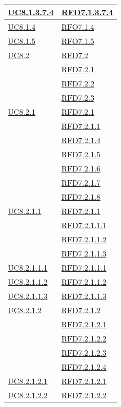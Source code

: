 \begin{longtable}{|>{\centering}m{5cm}|m{5cm}<{\centering}|}
\hyperref[UC8.1.3.7.4]{UC8.1.3.7.4} & \hyperlink{RFD7.1.3.7.4}{RFD7.1.3.7.4}\\ \hline
\hyperref[UC8.1.4]{UC8.1.4} & \hyperlink{RFO7.1.4}{RFO7.1.4}\\ \hline
\hyperref[UC8.1.5]{UC8.1.5} & \hyperlink{RFO7.1.5}{RFO7.1.5}\\ \hline
\hyperref[UC8.2]{UC8.2} & \hyperlink{RFD7.2}{RFD7.2}\\
& \hyperlink{RFD7.2.1}{RFD7.2.1}\\
& \hyperlink{RFD7.2.2}{RFD7.2.2}\\
& \hyperlink{RFD7.2.3}{RFD7.2.3}\\ \hline
\hyperref[UC8.2.1]{UC8.2.1} & \hyperlink{RFD7.2.1}{RFD7.2.1}\\
& \hyperlink{RFD7.2.1.1}{RFD7.2.1.1}\\
& \hyperlink{RFD7.2.1.4}{RFD7.2.1.4}\\
& \hyperlink{RFD7.2.1.5}{RFD7.2.1.5}\\
& \hyperlink{RFD7.2.1.6}{RFD7.2.1.6}\\
& \hyperlink{RFD7.2.1.7}{RFD7.2.1.7}\\
& \hyperlink{RFD7.2.1.8}{RFD7.2.1.8}\\ \hline
\hyperref[UC8.2.1.1]{UC8.2.1.1} & \hyperlink{RFD7.2.1.1}{RFD7.2.1.1}\\
& \hyperlink{RFD7.2.1.1.1}{RFD7.2.1.1.1}\\
& \hyperlink{RFD7.2.1.1.2}{RFD7.2.1.1.2}\\
& \hyperlink{RFD7.2.1.1.3}{RFD7.2.1.1.3}\\ \hline
\hyperref[UC8.2.1.1.1]{UC8.2.1.1.1} & \hyperlink{RFD7.2.1.1.1}{RFD7.2.1.1.1}\\ \hline
\hyperref[UC8.2.1.1.2]{UC8.2.1.1.2} & \hyperlink{RFD7.2.1.1.2}{RFD7.2.1.1.2}\\ \hline
\hyperref[UC8.2.1.1.3]{UC8.2.1.1.3} & \hyperlink{RFD7.2.1.1.3}{RFD7.2.1.1.3}\\ \hline
\hyperref[UC8.2.1.2]{UC8.2.1.2} & \hyperlink{RFD7.2.1.2}{RFD7.2.1.2}\\
& \hyperlink{RFD7.2.1.2.1}{RFD7.2.1.2.1}\\
& \hyperlink{RFD7.2.1.2.2}{RFD7.2.1.2.2}\\
& \hyperlink{RFD7.2.1.2.3}{RFD7.2.1.2.3}\\
& \hyperlink{RFD7.2.1.2.4}{RFD7.2.1.2.4}\\ \hline
\hyperref[UC8.2.1.2.1]{UC8.2.1.2.1} & \hyperlink{RFD7.2.1.2.1}{RFD7.2.1.2.1}\\ \hline
\hyperref[UC8.2.1.2.2]{UC8.2.1.2.2} & \hyperlink{RFD7.2.1.2.2}{RFD7.2.1.2.2}\\ \hline

\end{longtable}
